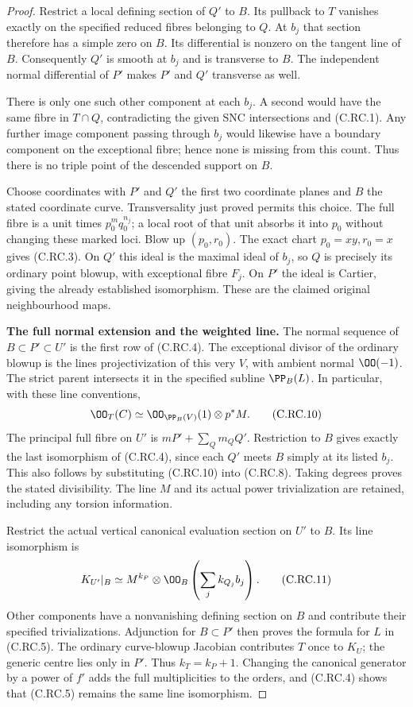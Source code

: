 \begin{proof}
Restrict a local defining section of
$Q'$ to $B$. Its pullback to $T$
vanishes exactly on the specified
reduced fibres belonging to $Q$.
At $b_j$ that section therefore
has a simple zero on $B$. Its
differential is nonzero on the
tangent line of $B$. Consequently
$Q'$ is smooth at $b_j$ and is
transverse to $B$. The independent
normal differential of $P'$ makes
$P'$ and $Q'$ transverse as well.

There is only one such other
component at each $b_j$. A second
would have the same fibre in
$T\cap Q$, contradicting the
given SNC intersections and
(C.RC.1). Any further image
component passing through $b_j$
would likewise have a boundary
component on the exceptional
fibre; hence none is missing
from this count. Thus there is
no triple point of the descended
support on $B$.

Choose coordinates with $P'$ and
$Q'$ the first two coordinate
planes and $B$ the stated
coordinate curve. Transversality
just proved permits this choice.
The full fibre is a unit times
$p_0^m q_0^{n_j}$; a local root
of that unit absorbs it into
$p_0$ without changing these
marked loci. Blow up $(p_0,r_0)$.
The exact chart $p_0=xy,r_0=x$
gives (C.RC.3). On $Q'$ this
ideal is the maximal ideal
of $b_j$, so $Q$ is precisely
its ordinary point blowup,
with exceptional fibre $F_j$.
On $P'$ the ideal is Cartier,
giving the already established
isomorphism. These are the
claimed original neighbourhood
maps.

\par\medskip\noindent\textbf{The full normal extension and the weighted line.}
The normal sequence of
$B\subset P'\subset U'$
is the first row of (C.RC.4).
The exceptional divisor of
the ordinary blowup is the
lines projectivization of
this very $V$, with
ambient normal $\OO(-1)$.
The strict parent intersects
it in the specified subline
$\PP_B(L)$. In particular,
with these line conventions,
\[
                 \OO_T(C)\simeq
                      \OO_{\PP_B(V)}(1)\otimes p^*M.
\tag{C.RC.10}
\]
The principal full fibre on
$U'$ is $mP'+\sum_Qm_QQ'$.
Restriction to $B$ gives
exactly the last isomorphism
of (C.RC.4), since each
$Q'$ meets $B$ simply at
its listed $b_j$. This
also follows by substituting
(C.RC.10) into (C.RC.8).
Taking degrees proves the
stated divisibility. The
line $M$ and its actual
power trivialization are
retained, including any
torsion information.

Restrict the actual vertical
canonical evaluation section
on $U'$ to $B$. Its line
isomorphism is
\[
 K_{U'}|_B\simeq
       M^{k_P}\otimes
             \OO_B\left(\sum_jk_{Q_j}b_j\right).
\tag{C.RC.11}
\]
Other components have a
nonvanishing defining section
on $B$ and contribute their
specified trivializations.
Adjunction for $B\subset P'$
then proves the formula for
$L$ in (C.RC.5). The
ordinary curve-blowup
Jacobian contributes $T$
once to $K_U$; the generic
centre lies only in $P'$.
Thus $k_T=k_P+1$.
Changing the canonical
generator by a power of $f'$
adds the full multiplicities
to the orders, and (C.RC.4)
shows that (C.RC.5) remains
the same line isomorphism.


\end{proof}
